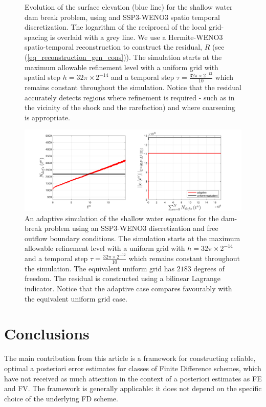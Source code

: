 \documentclass[final]{amsart}
\numberwithin{equation}{section}
\begin{document}
\begin{figure}[H]
\begin{subfigure}[b]{.25\textwidth}
	\caption{
		\label{fig_shw_dambreakSHW_dambreak_RK3_WENO3_rec_3_fixed_gs_stills_7001_adaptONOFF}
	}
\end{subfigure}
	\caption{\label{fig:SSP3WENO_shw_stills} Evolution of the surface elevation (blue line) for the shallow water dam break problem, using and SSP3-WENO3 spatio temporal discretization.  The logarithm of the reciprocal of the local grid-spacing is overlaid with a grey line. We use a Hermite-WENO3 spatio-temporal reconstruction to construct the residual, $R$ (see (\ref{eq_reconstruction_gen_cons})). The simulation starts at the maximum allowable refinement level with a uniform grid with spatial step $h=32\pi \times 2^{-14}$ and a temporal step $\tau =\frac{32\pi\times2^{-12}}{10}$ which remains constant throughout the simulation.  Notice that the residual accurately detects regions where refinement is required - such as in the vicinity of the shock and the rarefaction) and where coarsening is appropriate.}
\end{figure}


\begin{figure}[H]
\centering
\includegraphics[width=\textwidth]{../figures/fig_SHW_dambreak_RK3_WENO3_rec_3_fixed_gsplots_1x5_shw_dambreak_comparison_adaptONOFF}	
	\caption{\label{fig:SSP3WENO3_shw_dambreak_adapt} An adaptive simulation of the shallow water equations for the dam-break problem using an SSP3-WENO3 discretization and free outflow boundary conditions.  The simulation starts at the maximum allowable refinement level with a uniform grid with $h=32\pi \times 2^{-14}$ and a temporal step $\tau =\frac{32\pi\times2^{-12}}{10}$ which remains constant throughout the simulation. The equivalent uniform grid has $2183$ degrees of freedom.  The residual is constructed using a bilinear Lagrange indicator. Notice that the adaptive case compares favourably with the equivalent uniform grid case. }
\end{figure}

\section{Conclusions}\label{sec:conclusion}
The main contribution from this article is a framework for constructing reliable, optimal a posteriori error estimates for classes of Finite Difference schemes, which have not received as much attention in the context of a posteriori estimates as FE and FV.   The framework is generally applicable: it does not depend on the specific choice of the underlying FD scheme.
\end{document}
